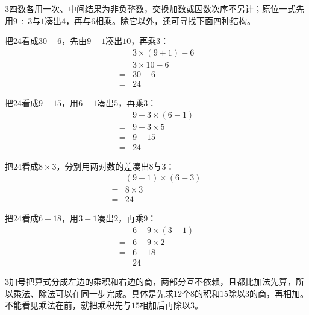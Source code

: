 \documentclass[multi=snippet,border={5bp 20bp 5bp 5bp}]{standalone}
\newenvironment{snippet}[3]{\begin{minipage}{#1bp}\color{answerred}\fontsize{#2}{#3}\selectfont\raggedright}{\end{minipage}}
\begin{document}
\begin{snippet}{505}{11.5}{14}\begin{multicols}{3}\raggedcolumns 四数各用一次、中间结果为非负整数，交换加数或因数次序不另计；原位一式先用\(9\div3\)\allowbreak 与\(1\)\allowbreak 凑出\(4\)\allowbreak ，再与\(6\)\allowbreak 相乘。除它以外，还可寻找下面四种结构。\par 把\(24\)\allowbreak 看成\(30-6\)\allowbreak ，先由\(9+1\)\allowbreak 凑出\(10\)\allowbreak ，再乘\(3\)\allowbreak ：\[\begin{aligned}&3\times(9+1)-6\\={}&3\times10-6\\={}&30-6\\={}&24\end{aligned}\]\par 把\(24\)\allowbreak 看成\(9+15\)\allowbreak ，用\(6-1\)\allowbreak 凑出\(5\)\allowbreak ，再乘\(3\)\allowbreak ：\[\begin{aligned}&9+3\times(6-1)\\={}&9+3\times5\\={}&9+15\\={}&24\end{aligned}\]\par 把\(24\)\allowbreak 看成\(8\times3\)\allowbreak ，分别用两对数的差凑出\(8\)\allowbreak 与\(3\)\allowbreak ：\[\begin{aligned}&(9-1)\times(6-3)\\={}&8\times3\\={}&24\end{aligned}\]\par 把\(24\)\allowbreak 看成\(6+18\)\allowbreak ，用\(3-1\)\allowbreak 凑出\(2\)\allowbreak ，再乘\(9\)\allowbreak ：\[\begin{aligned}&6+9\times(3-1)\\={}&6+9\times2\\={}&6+18\\={}&24\end{aligned}\]\end{multicols}\end{snippet}
\begin{snippet}{505}{11.5}{14}\begin{multicols}{3}\raggedcolumns 加号把算式分成左边的乘积和右边的商，两部分互不依赖，且都比加法先算，所以乘法、除法可以在同一步完成。具体是先求\(12\)\allowbreak 个\(8\)\allowbreak 的积和\(15\)\allowbreak 除以\(3\)\allowbreak 的商，再相加。不能看见乘法在前，就把乘积先与\(15\)\allowbreak 相加后再除以\(3\)\allowbreak 。\end{multicols}\end{snippet}
\end{document}
